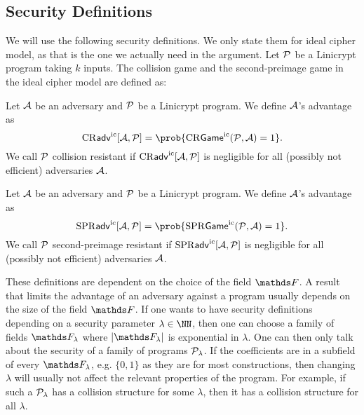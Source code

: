 \subsection{Security Definitions}
We will use the following security definitions.
We only state them for ideal cipher model,
as that is the one we actually need in the argument.
Let $\P$ be a Linicrypt program taking $k$ inputs.
The collision game and the second-preimage game in the ideal cipher model are defined as:
\begin{pchstack}[center, space=0.4cm]
\end{pchstack}

\begin{defn}
  Let $\A$ be an adversary and $\P$ be a Linicrypt program.
  We define $\A$'s advantage as 
  \[
    \cradv[\A, \P] = \prob{\crgame(\P, \A) = 1}.
  \]
  We call $\P$ collision resistant if
  $\cradv[\A, \P]$ is negligible for all (possibly not efficient) adversaries $\A$.
\end{defn}

\begin{defn}
  Let $\A$ be an adversary and $\P$ be a Linicrypt program.
  We define $\A$'s advantage as 
  \[
    \spradv[\A, \P] = \prob{\sprgame(\P, \A) = 1}.
  \]
  We call $\P$ second-preimage resistant
  if $\spradv[\A, \P]$ is negligible for all (possibly not efficient) adversaries $\A$.
\end{defn}

These definitions are dependent on the choice of the field $\F$.
A result that limits the advantage of an adversary against a program usually depends on the size of the field $\F$.
If one wants to have security definitions depending on a security parameter $\lambda \in \NN$,
then one can choose a family of fields $\F_\lambda$ where $|\F_\lambda|$ is exponential in $\lambda$.
One can then only talk about the security of a family of programs $\P_\lambda$.
If the coefficients are in a subfield of every $\F_\lambda$,
e.g. $\{0,1\}$ as they are for most constructions,
then changing $\lambda$ will usually not affect the relevant properties of the program.
For example, if such a $\P_\lambda$ has a collision structure for some $\lambda$,
then it has a collision structure for all $\lambda$.
